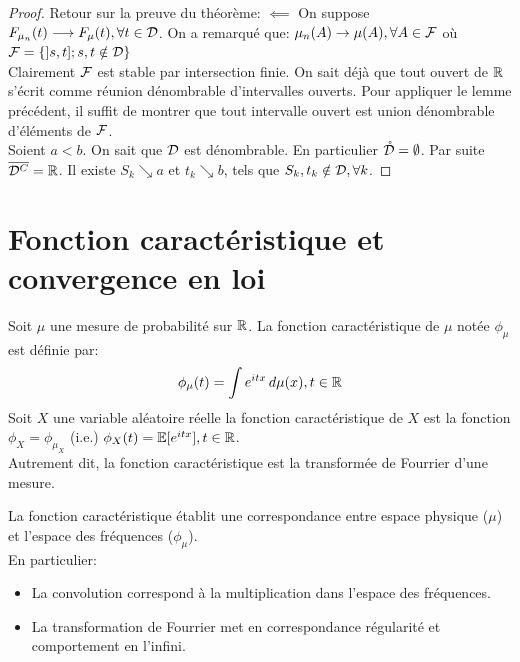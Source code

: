 \documentclass[]{report}
\begin{document}
    \begin{proof}
        Retour sur la preuve du théorème: $\impliedby$ On suppose $F_{\mu_n}(t)\longrightarrow F_\mu(t),\forall t\in \mathcal{D}$. On a remarqué que: $\mu_n(A)\to \mu(A),\forall A\in \mathcal{F}$ où $\mathcal{F}=\{]s,t]; s,t\notin \mathcal{D}\}$\\
        Clairement $\mathcal{F}$ est stable par intersection finie. On sait déjà que tout ouvert de $\mathbb{R}$ s'écrit comme réunion dénombrable d'intervalles ouverts. Pour appliquer le lemme précédent, il suffit de montrer que tout intervalle ouvert est union dénombrable d'éléments de $\mathcal{F}$.\\
        Soient $a<b$. On sait que $\mathcal{D}$ est dénombrable. En particulier $\mathring{\mathcal{D}}=\emptyset$. Par suite $\overline{\mathcal{D}^C}=\mathbb{R}$. Il existe $S_k\searrow a$ et $t_k\searrow b$, tels que $S_k,t_k\notin \mathcal{D},\forall k$.
    \end{proof}

    \section{Fonction caractéristique et convergence en loi}

    \begin{df}{}{}
        Soit $\mu$ une mesure de probabilité sur $\mathbb{R}$. La fonction caractéristique de $\mu$ notée $\phi_\mu$ est définie par:
        \[\phi_{\mu}(t)=\int e^{itx}\,d\mu (x),t\in \mathbb{R}\]
        Soit $X$ une variable aléatoire réelle la fonction caractéristique de $X$ est la fonction $\phi_X=\phi_{\mu_X}$ (i.e.) $\phi_X(t)=\mathbb{E}[ e^{itx}],t\in \mathbb{R}$.\\
        Autrement dit, la fonction caractéristique est la transformée de Fourrier d'une mesure.
    \end{df}

    \begin{re}{}{}
        La fonction caractéristique établit une correspondance entre espace physique ($\mu$) et l'espace des fréquences ($\phi_\mu$).\\
        En particulier: \begin{itemize}
            \item La convolution correspond à la multiplication dans l'espace des fréquences.
            \item La transformation de Fourrier met en correspondance régularité et comportement en l'infini.
        \end{itemize}
    \end{re}
\end{document}
